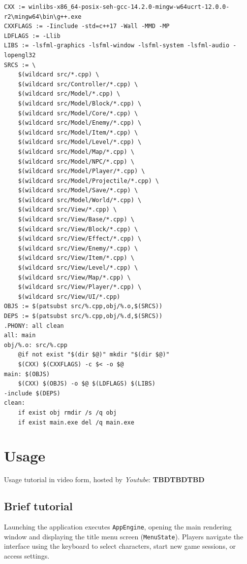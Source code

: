 \documentclass[12pt, a4paper]{article}
\begin{document}
\begin{enumerate}
\begin{lstlisting}[firstnumber=1, keywordstyle=\color{black},
    commentstyle=\color{black},
    stringstyle=\color{black}]
CXX := winlibs-x86_64-posix-seh-gcc-14.2.0-mingw-w64ucrt-12.0.0-r2\mingw64\bin\g++.exe
CXXFLAGS := -Iinclude -std=c++17 -Wall -MMD -MP
LDFLAGS := -Llib
LIBS := -lsfml-graphics -lsfml-window -lsfml-system -lsfml-audio -lopengl32
SRCS := \
    $(wildcard src/*.cpp) \
    $(wildcard src/Controller/*.cpp) \
    $(wildcard src/Model/*.cpp) \
    $(wildcard src/Model/Block/*.cpp) \
    $(wildcard src/Model/Core/*.cpp) \
    $(wildcard src/Model/Enemy/*.cpp) \
    $(wildcard src/Model/Item/*.cpp) \
    $(wildcard src/Model/Level/*.cpp) \
    $(wildcard src/Model/Map/*.cpp) \
    $(wildcard src/Model/NPC/*.cpp) \
    $(wildcard src/Model/Player/*.cpp) \
    $(wildcard src/Model/Projectile/*.cpp) \
    $(wildcard src/Model/Save/*.cpp) \
    $(wildcard src/Model/World/*.cpp) \
    $(wildcard src/View/*.cpp) \
    $(wildcard src/View/Base/*.cpp) \
    $(wildcard src/View/Block/*.cpp) \
    $(wildcard src/View/Effect/*.cpp) \
    $(wildcard src/View/Enemy/*.cpp) \
    $(wildcard src/View/Item/*.cpp) \
    $(wildcard src/View/Level/*.cpp) \
    $(wildcard src/View/Map/*.cpp) \
    $(wildcard src/View/Player/*.cpp) \
    $(wildcard src/View/UI/*.cpp)
OBJS := $(patsubst src/%.cpp,obj/%.o,$(SRCS))
DEPS := $(patsubst src/%.cpp,obj/%.d,$(SRCS))
.PHONY: all clean
all: main
obj/%.o: src/%.cpp
	@if not exist "$(dir $@)" mkdir "$(dir $@)"
	$(CXX) $(CXXFLAGS) -c $< -o $@
main: $(OBJS)
	$(CXX) $(OBJS) -o $@ $(LDFLAGS) $(LIBS)
-include $(DEPS)
clean:
	if exist obj rmdir /s /q obj
	if exist main.exe del /q main.exe
\end{lstlisting}

\end{enumerate}

\newpage

\section{Usage}
Usage tutorial in video form, hosted by \textit{Youtube}: \textbf{TBDTBDTBD}

\subsection{Brief tutorial}

Launching the application executes \texttt{AppEngine}, opening the main rendering window and displaying the title menu screen (\texttt{MenuState}). Players navigate the interface using the keyboard to select characters, start new game sessions, or access settings.
\end{document}
